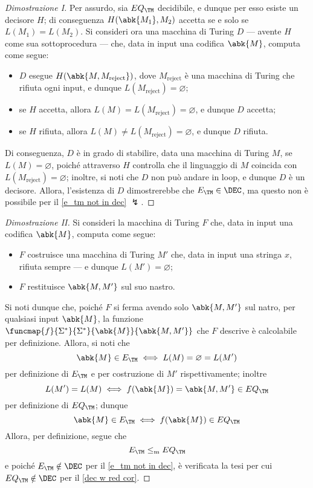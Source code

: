 \documentclass[a4paper, 12pt]{report}
\begin{document}
    \begin{proof}[Dimostrazione I]
        Per assurdo, sia $EQ_\TM$ decidibile, e dunque per esso esiste un decisore $H$; di conseguenza $H(\abk{M_1}, {M_2})$ accetta se e solo se $L(M_1)= L(M_2)$. Si consideri ora una macchina di Turing $D$ --- avente $H$ come sua sottoprocedura --- che, data in input una codifica $\abk{M}$, computa come segue:

        \begin{itemize}
            \item $D$ esegue $H(\abk{M, M_\mathrm{reject}})$, dove $M_\mathrm{reject }$ è una macchina di Turing che rifiuta ogni input, e dunque $L(M_\mathrm{reject}) = \varnothing$;
            \item se $H$ accetta, allora $L(M) = L(M_\mathrm{reject}) = \varnothing$, e dunque $D$ accetta;
            \item se $H$ rifiuta, allora $L(M) \neq L(M_\mathrm{reject}) = \varnothing$, e dunque $D$ rifiuta.
        \end{itemize}

        Di conseguenza, $D$ è in grado di stabilire, data una macchina di Turing $M$, se $L(M) = \varnothing$, poiché attraverso $H$ controlla che il linguaggio di $M$ coincida con $L(M_\mathrm{reject})= \varnothing$; inoltre, si noti che $D$ non può andare in loop, e dunque $D$ è un decisore. Allora, l'esistenza di $D$ dimostrerebbe che $E_\TM \in \DEC$, ma questo non è possibile per il \cref{e_tm not in dec} $\lightning$.
    \end{proof}

    \begin{proof}[Dimostrazione II]
        Si consideri la macchina di Turing $F$ che, data in input una codifica $\abk{M}$, computa come segue:

        \begin{itemize}
            \item $F$ costruisce una macchina di Turing $M'$ che, data in input una stringa $x$, rifiuta sempre --- e dunque $L(M') = \varnothing$;
            \item $F$ restituisce $\abk{M, M'}$ sul suo nastro.
        \end{itemize}
        
        Si noti dunque che, poiché $F$ si ferma avendo solo $\abk{M, M'}$ sul natro, per qualsiasi input $\abk{M}$, la funzione $\funcmap{f}{\Sigma^*}{\Sigma^*}{\abk{M}}{\abk{M, M'}}$ che $F$ descrive è calcolabile per definizione. Allora, si noti che $$\abk{M} \in E_\TM \iff L(M) = \varnothing = L(M')$$ per definizione di $E_\TM$ e per costruzione di $M'$ rispettivamente; inoltre $$L(M') = L(M) \iff f(\abk{M}) = \abk{M, M'} \in EQ_\TM$$ per definizione di $EQ_\TM$; dunque $$\abk{M} \in E_\TM \iff f(\abk{M}) \in EQ_\TM $$ Allora, per definizione, segue che $$E_\TM \leq_\mathrm m EQ_\TM$$ e poiché $E_\TM \notin \DEC$ per il \cref{e_tm not in dec}, è verificata la tesi per cui $EQ_\TM \notin \DEC$ per il \cref{dec w red cor}.
    \end{proof}
\end{document}
